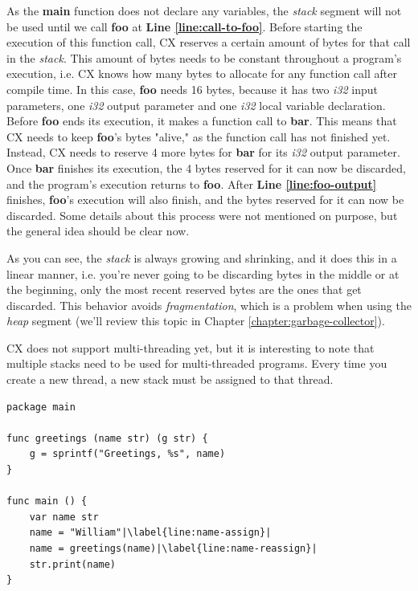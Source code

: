 \documentclass[11pt,fleqn,openany]{book} %
\begin{document}
As the \textbf{main} function does not declare any variables, the \emph{stack} segment will not be used until we call \textbf{foo} at \textbf{Line \ref{line:call-to-foo}}. Before starting the execution of this function call, CX reserves a certain amount of bytes for that call in the \emph{stack}. This amount of bytes needs to be constant throughout a program's execution, i.e. CX knows how many bytes to allocate for any function call after compile time. In this case, \textbf{foo} needs 16 bytes, because it has two \emph{i32} input parameters, one \emph{i32} output parameter and one \emph{i32} local variable declaration. Before \textbf{foo} ends its execution, it makes a function call to \textbf{bar}. This means that CX needs to keep \textbf{foo}'s bytes "alive," as the function call has not finished yet. Instead, CX needs to reserve 4 more bytes for \textbf{bar} for its \emph{i32} output parameter. Once \textbf{bar} finishes its execution, the 4 bytes reserved for it can now be discarded, and the program's execution returns to \textbf{foo}. After \textbf{Line \ref{line:foo-output}} finishes, \textbf{foo}'s execution will also finish, and  the bytes reserved for it can now be discarded. Some details about this process were not mentioned on purpose, but the general idea should be clear now.

As you can see, the \emph{stack} is always growing and shrinking, and it does this in a linear manner, i.e. you're never going to be discarding bytes in the middle or at the beginning, only the most recent reserved bytes are the ones that get discarded. This behavior avoids \emph{fragmentation}, which is a problem when using the \emph{heap} segment (we'll review this topic in Chapter \ref{chapter:garbage-collector}).

CX does not support multi-threading yet, but it is interesting to note that multiple stacks need to be used for multi-threaded programs. Every time you create a new thread, a new stack must be assigned to that thread.

\begin{lstlisting}[caption={Pointer to a Structu},captionpos=b,label={listing:strings-heap}]
package main

func greetings (name str) (g str) {
	g = sprintf("Greetings, %s", name)
}

func main () {
	var name str
	name = "William"|\label{line:name-assign}|
	name = greetings(name)|\label{line:name-reassign}|
	str.print(name)
}
\end{lstlisting}
\end{document}
